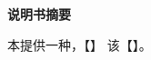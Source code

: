 \documentclass[heading=true,zihao=-4]{ctexart}
\begin{document}
\fi

\ifx\foothide\undefined
\else
	\fancyfoot{}
	\headtit{}
	\centerline{\textbf{\large{说明书摘要}}}
\fi
	


本\pattype 提供一种\pattitle ，【】
该\patthemef 【】。


\ifx\allfiles\undefined
\end{document}
